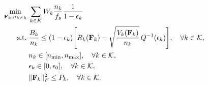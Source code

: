 \documentclass[a4paper, 12pt, onecolumn, journal, twoside, draftclsnofoot]{IEEEtran}
\begin{document}
\begin{equation}
	\begin{split}
		\min_{{\bf F}_k, n_k, \epsilon_k} &\; \sum_{k \in K} W_k \frac{n_k}{f_s} \frac{1}{1-\epsilon_k} \\
		\text{s.t.} &\; \frac{B_k}{n_k} \le (1-\epsilon_k) \Bigg[ R_k({\bf F}_k) - \sqrt{\frac{V_k({\bf F}_k)}{n_k}} \, Q^{-1}(\epsilon_k) \Bigg], \quad \forall k \in { \mathcal{K} }, \\
		&\; n_k \in [n_{\min}, n_{\max}], \quad \forall k \in { \mathcal{K} }, \\
		&\; \epsilon_k \in [0, \epsilon_0], \quad \forall k \in { \mathcal{K} }, \\
		&\; \|{\bf F}_k\|_F^2 \le P_k, \quad \forall k \in { \mathcal{K} }.
	\end{split}
\label{eq_short_blocklength_latency_min__retrans_prob}
\end{equation}
\end{document}

